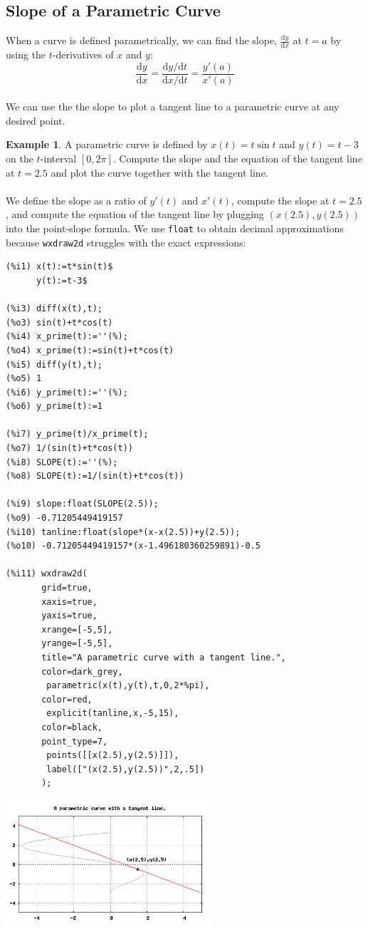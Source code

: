 \documentclass[10.5pt,twoside]{report}
\theoremstyle{definition}
\newtheorem{exmp}{Example}[section]
\begin{document}
\subsection{Slope of a Parametric Curve}

When a curve is defined parametrically, we can find the slope, $\frac{\mathrm{d}y}{\mathrm{d}x}$ at $t=a$ by using the $t$-derivatives of $x$ and $y$:\\
\[\frac{\mathrm{d}y}{\mathrm{d}x}=\frac{\mathrm{d}y / \mathrm{d}t}{\mathrm{d}x / \mathrm{d}t}=\frac{y'(a)}{x'(a)}\]
${}$\\
We can use the the slope to plot a tangent line to a parametric curve at any desired point.

\begin{exmp} A parametric curve is defined by $x(t)=t\sin{t}$ and $y(t)=t-3$ on the $t$-interval $[0,2\pi]$.  Compute the slope and the equation of the tangent line at $t=2.5$ and plot the curve together with the tangent line.\\
${}$\\

We define the slope as a ratio of $y'(t)$ and $x'(t)$, compute the slope at $t=2.5$, and compute the equation of the tangent line by plugging $(x(2.5),y(2.5))$ into the point-slope formula.  We use \verb|float| to obtain decimal approximations because \verb|wxdraw2d| struggles with the exact expressions:

\begin{verbatim}
(%i1) x(t):=t*sin(t)$
      y(t):=t-3$
      
(%i3) diff(x(t),t);
(%o3) sin(t)+t*cos(t)
(%i4) x_prime(t):=''(%);
(%o4) x_prime(t):=sin(t)+t*cos(t)
(%i5) diff(y(t),t);
(%o5) 1
(%i6) y_prime(t):=''(%);
(%o6) y_prime(t):=1

(%i7) y_prime(t)/x_prime(t);
(%o7) 1/(sin(t)+t*cos(t))
(%i8) SLOPE(t):=''(%);
(%o8) SLOPE(t):=1/(sin(t)+t*cos(t))

(%i9) slope:float(SLOPE(2.5));
(%o9) -0.71205449419157
(%i10) tanline:float(slope*(x-x(2.5))+y(2.5));
(%o10) -0.71205449419157*(x-1.496180360259891)-0.5

(%i11) wxdraw2d(
       grid=true,
       xaxis=true,
       yaxis=true,
       xrange=[-5,5],
       yrange=[-5,5],
       title="A parametric curve with a tangent line.",
       color=dark_grey,
        parametric(x(t),y(t),t,0,2*%pi),
       color=red,
        explicit(tanline,x,-5,15),
       color=black,
       point_type=7,
        points([[x(2.5),y(2.5)]]),
        label(["(x(2.5),y(2.5))",2,.5])
       );
\end{verbatim}

\includegraphics[width=3in]{example_5_2_1_1}

\end{exmp}
\end{document}
